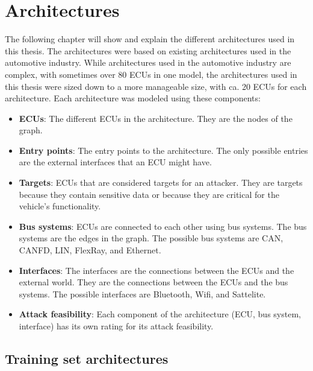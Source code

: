 \chapter{Architectures}
\label{chp:arch}

The following chapter will show and explain the different architectures used in this thesis.
The architectures were based on existing architectures used in the automotive industry.
While architectures used in the automotive industry are complex, with sometimes over 80 ECUs in one model, the architectures used in this thesis were sized down to a more manageable size, with ca. 20 ECUs for each architecture.
Each architecture was modeled using these components:

\begin{itemize}

    \item \textbf{ECUs}: The different ECUs in the architecture. They are the nodes of the graph.
    
    \item \textbf{Entry points}: The entry points to the architecture. The only possible entries are the external interfaces that an ECU might have.
    
    \item \textbf{Targets}: ECUs that are considered targets for an attacker. They are targets because they contain sensitive data or because they are critical for the vehicle's functionality.
    
    \item \textbf{Bus systems}: ECUs are connected to each other using bus systems. The bus systems are the edges in the graph. The possible bus systems are CAN, CANFD, LIN, FlexRay, and Ethernet.
    
    \item \textbf{Interfaces}: The interfaces are the connections between the ECUs and the external world. They are the connections between the ECUs and the bus systems. The possible interfaces are Bluetooth, Wifi, and Sattelite.
    
    \item \textbf{Attack feasibility}: Each component of the architecture (ECU, bus system, interface) has its own rating for its attack feasibility.

\end{itemize}



\section{Training set architectures}
\label{sec:trainingarch}

